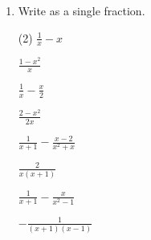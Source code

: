 \begin{enumerate} [leftmargin=0cm]
\begin{tasks}[label=(\alph*), after-item-skip=2pt,after-skip=3pt, label-width=4ex]
    \task  $ 25x^2 -9y^2                           $  \\  \begin{envAnswer} $  (5x+3y)(5x-3y)    $ \end{envAnswer}
    \task  $ 2x^2 -50                              $  \\  \begin{envAnswer} $  2(x+5)(x-5)       $ \end{envAnswer}
\end{tasks}    


    
\item Write as a single fraction.
\begin{tasks}[label=(\alph*), after-item-skip=2pt,after-skip=3pt, label-width=4ex](2)
    \task  $ \frac{1}{x}-x                          $    
                                                         \\  \begin{envAnswer} $   \frac{1-x^2}{x}           $ \end{envAnswer}
    \task  $ \frac{1}{x}-\frac{x}{2}                $    \\  \begin{envAnswer} $   \frac{2-x^2}{2x}          $ \end{envAnswer}
    \task  $ \frac{1}{x+1}-\frac{x-2}{x^2+x}        $    \\  \begin{envAnswer} $   \frac{2}{x(x+1)}          $ \end{envAnswer}
    \task  $ \frac{1}{x+1}-\frac{x}{x^2-1}          $    \\
    
            \begin{envAnswer} $ \displaystyle  -\frac{1}{(x+1)(x-1)}         $ \end{envAnswer}
    
    
    

\end{tasks}
\end{enumerate}
